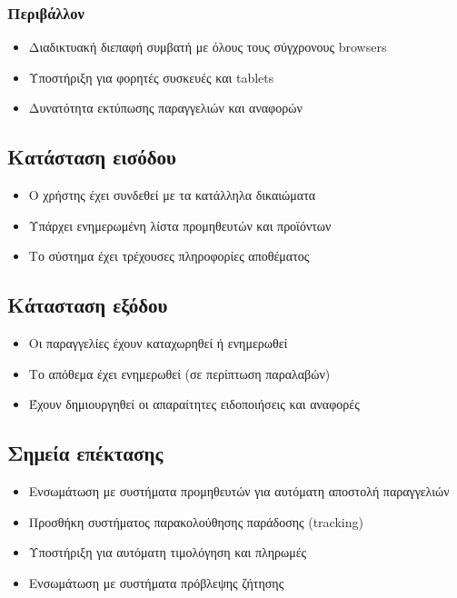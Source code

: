 \documentclass[12pt,a4paper,twoside]{book}
\begin{document}
\subsubsection{Περιβάλλον}
\begin{itemize}
  \item Διαδικτυακή διεπαφή συμβατή με όλους τους σύγχρονους browsers %
  \item Υποστήριξη για φορητές συσκευές και tablets
  \item Δυνατότητα εκτύπωσης παραγγελιών και αναφορών
\end{itemize}

\subsection{Κατάσταση εισόδου} %
\begin{itemize}
  \item Ο χρήστης έχει συνδεθεί με τα κατάλληλα δικαιώματα %
  \item Υπάρχει ενημερωμένη λίστα προμηθευτών και προϊόντων
  \item Το σύστημα έχει τρέχουσες πληροφορίες αποθέματος
\end{itemize}

\subsection{Κάτασταση εξόδου} %
\begin{itemize}
  \item Οι παραγγελίες έχουν καταχωρηθεί ή ενημερωθεί
  \item Το απόθεμα έχει ενημερωθεί (σε περίπτωση παραλαβών)
  \item Έχουν δημιουργηθεί οι απαραίτητες ειδοποιήσεις και αναφορές %
\end{itemize}

\subsection{Σημεία επέκτασης}
\begin{itemize}
  \item Ενσωμάτωση με συστήματα προμηθευτών για αυτόματη αποστολή παραγγελιών
  \item Προσθήκη συστήματος παρακολούθησης παράδοσης (tracking) %
  \item Υποστήριξη για αυτόματη τιμολόγηση και πληρωμές
  \item Ενσωμάτωση με συστήματα πρόβλεψης ζήτησης
\end{itemize}
\end{document}
